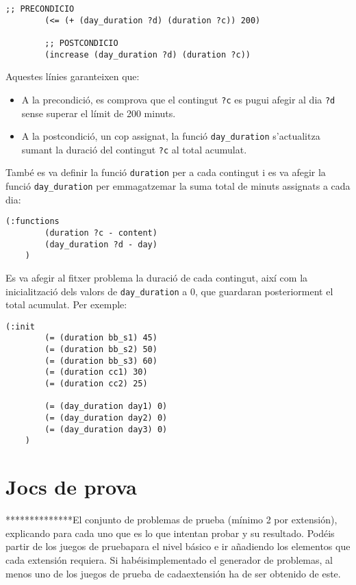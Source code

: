 \documentclass[a4paper]{article}
\begin{document}
	\begin{lstlisting}[language=PDDL, caption={Restriccions per controlar el límit de 200 minuts per dia}, label={lst:extensio4}]
		;; PRECONDICIO
		(<= (+ (day_duration ?d) (duration ?c)) 200)
		
		;; POSTCONDICIO
		(increase (day_duration ?d) (duration ?c))
	\end{lstlisting}
	
	Aquestes línies garanteixen que:
	\begin{itemize}
		\item A la precondició, es comprova que el contingut \texttt{?c} es pugui afegir al dia \texttt{?d} sense superar el límit de 200 minuts.
		\item A la postcondició, un cop assignat, la funció \texttt{day\_duration} s'actualitza sumant la duració del contingut \texttt{?c} al total acumulat.
	\end{itemize}
	
	També es va definir la funció \texttt{duration} per a cada contingut i es va afegir la funció \texttt{day\_duration} per emmagatzemar la suma total de minuts assignats a cada dia:
	\begin{lstlisting}[language=PDDL, caption={Funcions per l'extensió 4}, label={lst:funcionsExtensio4}]
	(:functions
		(duration ?c - content)
		(day_duration ?d - day)
	)
	\end{lstlisting}
	
	Es va afegir al fitxer problema la duració de cada contingut, així com la inicialització dels valors de \texttt{day\_duration} a 0, que guardaran posteriorment el total acumulat. Per exemple:
	\begin{lstlisting}[language=PDDL, caption={Novetats en la inicialització per l'extensió 4}, label={lst:iniExtensio4}]
	(:init
		(= (duration bb_s1) 45)
		(= (duration bb_s2) 50)
		(= (duration bb_s3) 60)
		(= (duration cc1) 30)
		(= (duration cc2) 25)
		
		(= (day_duration day1) 0)
		(= (day_duration day2) 0)
		(= (day_duration day3) 0)
	)
	\end{lstlisting}
	
	\newpage
	\section{Jocs de prova}
	**************El conjunto de problemas de prueba (mínimo 2 por extensión), explicando para cada uno que es lo que intentan probar y su resultado. Podéis partir de los juegos de pruebapara el nivel básico e ir añadiendo los elementos que cada extensión requiera. Si habéisimplementado el generador de problemas, al menos uno de los juegos de prueba de cadaextensión ha de ser obtenido de este.
	
\end{document}

